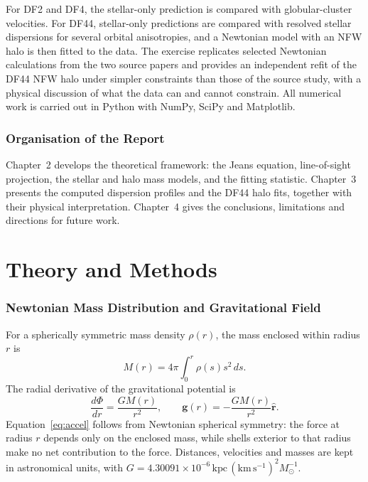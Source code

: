 \documentclass[12pt,a4paper]{report}
\numberwithin{equation}{chapter}
\begin{document}
For DF2 and DF4, the stellar-only prediction is compared with globular-cluster velocities. For DF44, stellar-only predictions are compared with resolved stellar dispersions for several orbital anisotropies, and a Newtonian model with an NFW halo is then fitted to the data. The exercise replicates selected Newtonian calculations from the two source papers and provides an independent refit of the DF44 NFW halo under simpler constraints than those of the source study, with a physical discussion of what the data can and cannot constrain. All numerical work is carried out in Python with NumPy, SciPy and Matplotlib.

\subsection*{Organisation of the Report}

Chapter~2 develops the theoretical framework: the Jeans equation, line-of-sight projection, the stellar and halo mass models, and the fitting statistic. Chapter~3 presents the computed dispersion profiles and the DF44 halo fits, together with their physical interpretation. Chapter~4 gives the conclusions, limitations and directions for future work.

\chapter{Theory and Methods}

\subsection*{Newtonian Mass Distribution and Gravitational Field}

For a spherically symmetric mass density $\rho(r)$, the mass enclosed within radius $r$ is
\begin{equation}
 M(r)=4\pi\int_0^r \rho(s)s^2\,ds.
 \label{eq:enclosed}
\end{equation}
The radial derivative of the gravitational potential is
\begin{equation}
 \frac{d\Phi}{dr}=\frac{GM(r)}{r^2},\qquad
 \mathbf g(r)=-\frac{GM(r)}{r^2}\hat{\mathbf r}.
 \label{eq:accel}
\end{equation}
Equation~\eqref{eq:accel} follows from Newtonian spherical symmetry: the force at radius $r$ depends only on the enclosed mass, while shells exterior to that radius make no net contribution to the force. Distances, velocities and masses are kept in astronomical units, with $G=4.30091\times10^{-6}\,\mathrm{kpc}\,(\mathrm{km\,s^{-1}})^2M_\odot^{-1}$.
\end{document}
